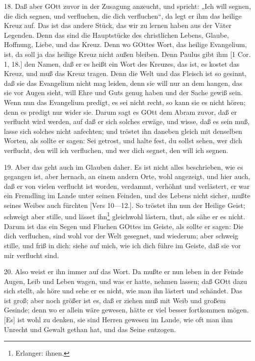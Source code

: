 18. Daß aber GOtt zuvor in der Zusagung anzeucht, und spricht: „Ich will segnen, die dich segnen, und verfluchen, die dich verfluchen“, da legt er ihm das heilige Kreuz auf. Das ist das andere Stück, das wir zu lernen haben aus der Väter Legenden. Denn das sind die Hauptstücke des christlichen Lebens, Glaube, Hoffnung, Liebe, und das Kreuz. Denn wo GOttes Wort, das heilige Evangelium, ist, da soll ja das heilige Kreuz nicht außen bleiben. Denn Paulus gibt ihm [1 Cor. 1, 18.] den Namen, daß er es heißt ein Wort des Kreuzes, das ist, es kostet das Kreuz, und muß das Kreuz tragen. Denn die Welt und das Fleisch ist so gesinnt, daß sie das Evangelium nicht mag leiden, denn sie will nur an dem hangen, das sie vor Augen sieht, will Ehre und Guts genug haben und der Sache gewiß sein. Wenn nun das Evangelium predigt, es sei nicht recht, so kann sie es nicht hören; denn es predigt nur wider sie. Darum sagt es GOtt dem Abram zuvor, daß er verflucht wird werden, auf daß er sich solches erwäge, und wisse, daß es sein muß, lasse sich solches nicht anfechten; und tröstet ihn daneben gleich mit denselben Worten, als sollte er sagen: Sei getrost, und halte fest, du sollst sehen, wer dich verflucht, den will ich verfluchen, und wer dich segnet, den will ich segnen.

19. Aber das geht auch im Glauben daher. Es ist nicht alles beschrieben, wie es gegangen ist, aber hernach, an einem andern Orte, wohl angezeigt, und hier auch, daß er von vielen verflucht ist worden, verdammt, verhöhnt und verlästert, er war ein Fremdling im Lande unter seinen Feinden, und des Lebens nicht sicher, mußte seines Weibes auch fürchten [Vers 10—12.]. So tröstet ihn nun der Heilige Geist; schweigt aber stille, und lässet ihn\footnote{Erlanger: ihnen.} gleichwohl lästern, thut, als sähe er es nicht. Darum ist das ein Segen und Fluchen GOttes im Geiste, als sollte er sagen: Die dich verfluchen, sind wohl vor der Welt gesegnet, und wiederum; aber schweig stille, und friß in dich: siehe auf mich, wie ich dich führe im Geiste, daß sie vor mir verflucht sind.

20. Also weist er ihn immer auf das Wort. Da mußte er nun leben in der Feinde Augen, Leib und Leben wagen, und was er hatte, nehmen lassen; daß GOtt dazu sich stellt, als höre und sehe er es nicht, wie man ihn lästert und schändet. Das ist groß; aber noch größer ist es, daß er ziehen muß mit Weib und großem Gesinde; denn wo er allein wäre gewesen, hätte er viel besser fortkommen mögen. [Es] ist wohl zu denken, sie sind Herren gewesen im Lande, wie oft man ihm Unrecht und Gewalt gethan hat, und das Seine entzogen.

